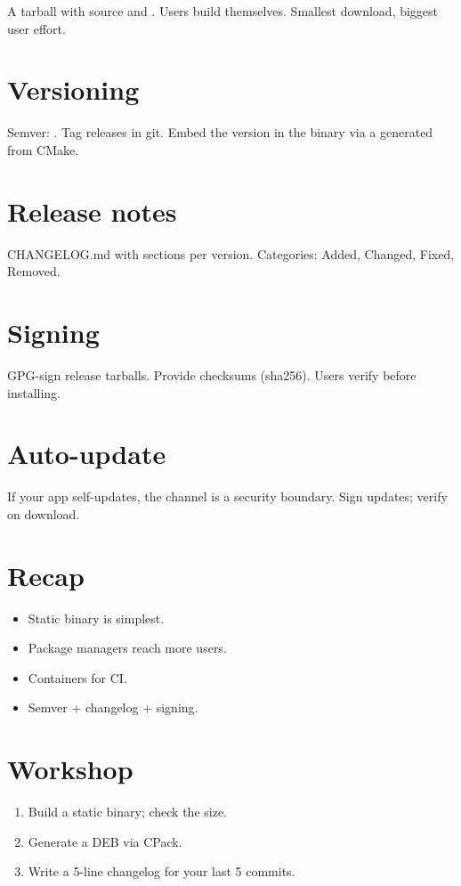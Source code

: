 A tarball with source and . Users
build themselves. Smallest download, biggest user effort.

\section{Versioning}

Semver: . Tag releases in git.
Embed the version in the binary via a 
generated from CMake.

\section{Release notes}

CHANGELOG.md with sections per version. Categories:
Added, Changed, Fixed, Removed.

\section{Signing}

GPG-sign release tarballs. Provide checksums (sha256).
Users verify before installing.

\section{Auto-update}

If your app self-updates, the channel is a security
boundary. Sign updates; verify on download.

\section{Recap}

\begin{recap}
\begin{itemize}[leftmargin=*]
  \item Static binary is simplest.
  \item Package managers reach more users.
  \item Containers for CI.
  \item Semver + changelog + signing.
\end{itemize}
\end{recap}

\section*{Workshop}

\begin{enumerate}[leftmargin=*]
  \item Build a static binary; check the size.
  \item Generate a DEB via CPack.
  \item Write a 5-line changelog for your last 5 commits.
\end{enumerate}
